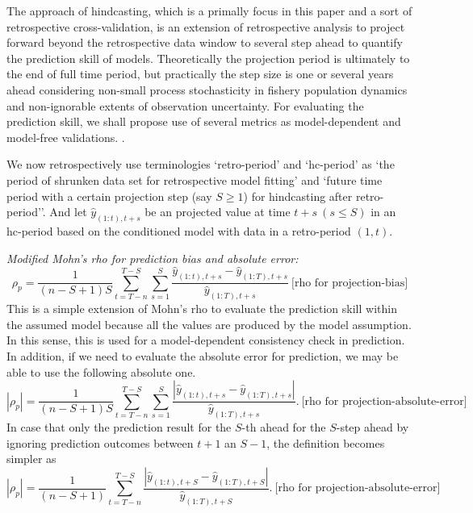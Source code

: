 \documentclass[a4paper]{article}
\newcommand{\disp}{\displaystyle}
\begin{document}
The approach of hindcasting, which is a primally focus in this paper and a sort of retrospective cross-validation, is an extension of retrospective analysis to project forward beyond the retrospective data window to several step ahead to quantify the prediction skill of models. Theoretically the projection period is ultimately to the end of full time period, but practically the step size is one or several years ahead considering non-small process stochasticity in fishery population dynamics and non-ignorable extents of observation uncertainty. For evaluating the prediction skill, we shall propose use of several metrics as model-dependent and model-free validations. . 

We now retrospectively use terminologies `retro-period' and `hc-period' as `the period of shrunken data set for retrospective model fitting' and `future time period with a certain projection step (say $S \geq 1$) for hindcasting after retro-period''. And let $\hat{y}_{(1:t),t+s}$ be an projected value at time $t+s \ (s \leq S)$ in an hc-period based on the conditioned model with data in a retro-period $(1,t)$. 

\vspace{0.2cm} \noindent
{\it Modified Mohn's rho for prediction bias and absolute error:}\\
\begin{equation}
\rho_p = \disp \frac{1}{(n-S+1)S} \sum_{t=T-n}^{T-S} \sum_{s=1}^S 
\frac{\hat{y}_{(1:t),t+s}-\hat{y}_{(1:T),t+s}}{\hat{y}_{(1:T),t+s}} 
\ \mbox{[rho for projection-bias]}
\end{equation} 
This is a simple extension of Mohn's rho to evaluate the prediction skill within the assumed model because all the values are produced by the model assumption. In this sense, this is used for a model-dependent consistency check in prediction. In addition, if we need to evaluate the absolute error for prediction, we may be able to use the following absolute one.
\begin{equation}
|\rho_p| = \disp \frac{1}{(n-S+1)S} \sum_{t=T-n}^{T-S} \sum_{s=1}^S 
\frac{\left| \hat{y}_{(1:t),t+s}-\hat{y}_{(1:T),t+s} \right|}{\hat{y}_{(1:T),t+s}}. 
\ \mbox{[rho for projection-absolute-error]}
\end{equation} 
In case that only the prediction result for the $S$-th ahead for the $S$-step ahead by ignoring prediction outcomes between $t+1$ an $S-1$, the definition becomes simpler as 
\begin{equation}
|\rho_p| = \disp \frac{1}{(n-S+1)} \sum_{t=T-n}^{T-S}
\frac{\left| \hat{y}_{(1:t),t+S}-\hat{y}_{(1:T),t+S} \right|}{\hat{y}_{(1:T),t+S}}. 
\ \mbox{[rho for projection-absolute-error]}
\end{equation} 
\end{document}
